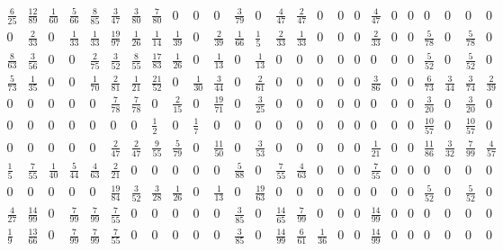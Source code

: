 \documentclass[11pt]{report}
\begin{document}
\begin{appendices}
\begin{landscape}
\begin{figure} [h!]
\begin{equation*}
\begin{array}{ccccccccccccccccccccccccc}
\frac{6}{25}&\frac{12}{89}&\frac{1}{60}&\frac{5}{66}&\frac{8}{85}&\frac{3}{47}&\frac{3}{80}&\frac{7}{80}&0&0&0&\frac{3}{79}&0&\frac{4}{47}&\frac{2}{47}&0&0&0&\frac{4}{47}&0&0&0&0&0&0\\

0&\frac{2}{33}&0&\frac{1}{33}&\frac{1}{33}&\frac{19}{97}&\frac{1}{26}&\frac{1}{14}&\frac{1}{39}&0&\frac{2}{39}&\frac{1}{66}&\frac{1}{5}&\frac{2}{33}&\frac{1}{33}&0&0&0&\frac{2}{33}&0&0&\frac{5}{78}&0&\frac{5}{78}&0\\

\frac{8}{63}&\frac{3}{56}&0&0&\frac{2}{75}&\frac{3}{52}&\frac{8}{55}&\frac{17}{83}&\frac{1}{26}&0&\frac{1}{13}&0&\frac{1}{13}&0&0&0&0&0&0&0&0&\frac{5}{52}&0&\frac{5}{52}&0\\

\frac{5}{73}&\frac{1}{35}&0&0&\frac{1}{70}&\frac{2}{81}&\frac{1}{21}&\frac{21}{52}&0&\frac{1}{30}&\frac{3}{44}&0&\frac{2}{61}&0&0&0&0&0&\frac{3}{86}&0&0&\frac{6}{73}&\frac{3}{44}&\frac{3}{74}&\frac{2}{39}\\

0&0&0&0&0&\frac{7}{78}&\frac{7}{78}&0&\frac{2}{15}&0&\frac{19}{71}&0&\frac{3}{25}&0&0&0&0&0&0&0&0&\frac{3}{20}&0&\frac{3}{20}&0\\

0&0&0&0&0&0&0&\frac{1}{2}&0&\frac{1}{7}&0&0&0&0&0&0&0&0&0&0&0&\frac{10}{57}&0&\frac{10}{57}&0\\

0&0&0&0&0&\frac{2}{47}&\frac{2}{47}&\frac{9}{55}&\frac{5}{79}&0&\frac{11}{50}&0&\frac{3}{53}&0&0&0&0&0&\frac{1}{21}&0&0&\frac{11}{86}&\frac{3}{32}&\frac{7}{99}&\frac{4}{57}\\

\frac{1}{5}&\frac{7}{55}&\frac{1}{40}&\frac{5}{44}&\frac{4}{63}&\frac{2}{21}&0&0&0&0&0&\frac{5}{88}&0&\frac{7}{55}&\frac{4}{63}&0&0&0&\frac{7}{55}&0&0&0&0&0&0\\

0&0&0&0&0&\frac{19}{84}&\frac{3}{52}&\frac{3}{28}&\frac{1}{26}&0&\frac{1}{13}&0&\frac{19}{63}&0&0&0&0&0&0&0&0&\frac{5}{52}&0&\frac{5}{52}&0\\

\frac{4}{27}&\frac{14}{99}&0&\frac{7}{99}&\frac{7}{99}&\frac{7}{55}&0&0&0&0&0&\frac{3}{85}&0&\frac{14}{65}&\frac{7}{99}&0&0&0&\frac{14}{99}&0&0&0&0&0&0\\

\frac{1}{9}&\frac{13}{66}&0&\frac{7}{99}&\frac{7}{99}&\frac{7}{55}&0&0&0&0&0&\frac{3}{85}&0&\frac{14}{99}&\frac{6}{61}&\frac{1}{36}&0&0&\frac{14}{99}&0&0&0&0&0&0\\


\end{array}
\end{equation*}
\end{figure}
\end{landscape}
\end{appendices}
\end{document}
